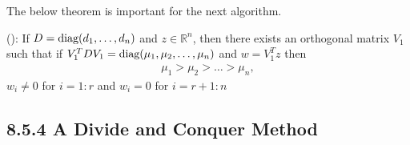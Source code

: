 The below theorem is important for the next algorithm.
\begin{theorem} ():
If $D=\text{diag}{(}d_1,\dots,d_n)$ and $z\in\mathbb R^n$, then there exists an orthogonal matrix
$V_1$ such that if $V_1^TDV_1=\text{diag}{(}\mu_1,\mu_2,\dots,\mu_n)$ and $w=V_1^Tz$ then
\begin{align}
	\mu_1>\mu_2>\dots>\mu_n,
\end{align}
$w_i\neq 0$ for $i=1:r$ and $w_i=0$ for $i = r+1:n$
\end{theorem}


\subsection*{8.5.4 A Divide and Conquer Method}%


